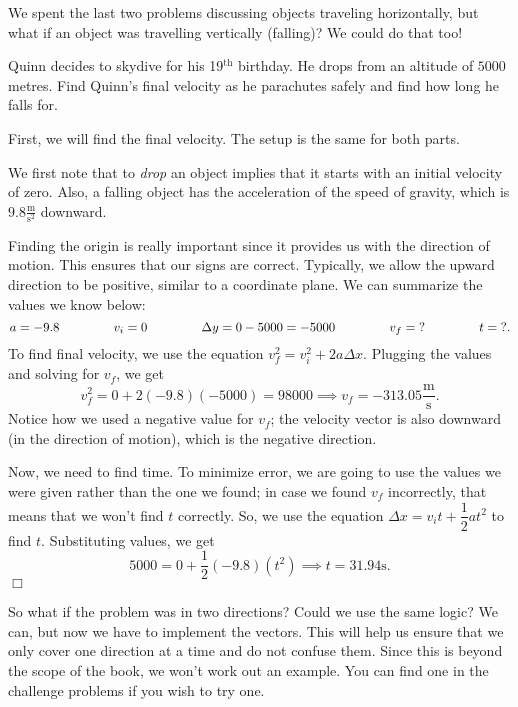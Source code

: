 \documentclass[../book.tex]{subfiles}
\begin{document}
We spent the last two problems discussing objects traveling horizontally, but what if an object was travelling vertically (falling)? We could do that too!
\begin{example}
Quinn decides to skydive for his 19$^\text{th}$ birthday. He drops from an altitude of $5000$ metres.  Find Quinn's final velocity as he parachutes safely and find how long he falls for.
\end{example}
\begin{solution}
First, we will find the final velocity.  The setup is the same for both parts.

We first note that to \textit{drop} an object implies that it starts with an initial velocity of zero.  Also, a falling object has the acceleration of the speed of gravity, which is $9.8\frac{\text{m}}{\text{s}^2}$ downward.

Finding the origin is really important since it provides us with the direction of motion.  This ensures that our signs are correct.  Typically, we allow the upward direction to be positive, similar to a coordinate plane.  We can summarize the values we know below: $$a=-9.8 \hspace{15mm} v_i=0 \hspace{15mm} \Delta y=0-5000=-5000 \hspace{15mm} v_f=\text{?} \hspace{15mm} t=\text{?}.$$ To find final velocity, we use the equation $v_f^2=v_i^2+2a\Delta x$.  Plugging the values and solving for $v_f$, we get $$v_f^2=0+2(-9.8)(-5000)=98000 \implies v_f=-313.05\frac{\text{m}}{\text{s}}.$$ Notice how we used a negative value for $v_f$; the velocity vector is also downward (in the direction of motion), which is the negative direction.

Now, we need to find time.  To minimize error, we are going to use the values we were given rather than the one we found; in case we found $v_f$ incorrectly, that means that we won't find $t$ correctly. So, we use the equation $\Delta x=v_it+\dfrac{1}{2}at^2$ to find $t$.  Substituting values, we get $$5000=0+\dfrac{1}{2}(-9.8)(t^2) \implies t=31.94\text{s}.$$ $\Box$
\end{solution}
So what if the problem was in two directions? Could we use the same logic? We can, but now we have to implement the vectors. This will help us ensure that we only cover one direction at a time and do not confuse them.  Since this is beyond the scope of the book, we won't work out an example.  You can find one in the challenge problems if you wish to try one.
\end{document}
